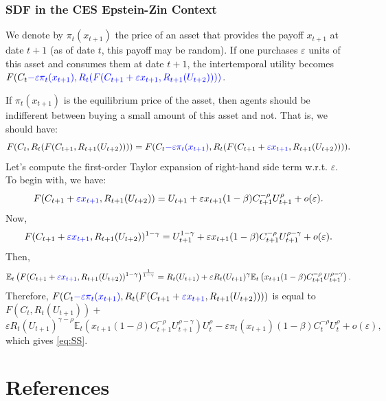 \documentclass[
  12pt,
]{book}
\theoremstyle{definition}
\theoremstyle{definition}
\theoremstyle{definition}
\theoremstyle{definition}
\theoremstyle{remark}
\begin{document}
\hypertarget{SDFEZ}{%
\subsection{SDF in the CES Epstein-Zin Context}\label{SDFEZ}}

We denote by \(\pi_t(x_{t+1})\) the price of an asset that provides the payoff \(x_{t+1}\) at date \(t+1\) (as of date \(t\), this payoff may be random). If one purchases \(\varepsilon\) units of this asset and consumes them at date \(t+1\), the intertemporal utility becomes \(F(C_t\color{blue}{ - \varepsilon \pi_t(x_{t+1})},R_t(F(C_{t+1}+\color{blue}{\varepsilon x_{t+1}},R_{t+1}(U_{t+2}))))\).

If \(\pi_t(x_{t+1})\) is the equilibrium price of the asset, then agents should be indifferent between buying a small amount of this asset and not. That is, we should have:
\[
F(C_t,R_t(F(C_{t+1},R_{t+1}(U_{t+2})))) =
F(C_t {\color{blue} - \varepsilon \pi_t(x_{t+1})},R_t(F(C_{t+1}+{\color{blue}\varepsilon x_{t+1}},R_{t+1}(U_{t+2})))).
\]
Let's compute the first-order Taylor expansion of right-hand side term w.r.t. \(\varepsilon\). To begin with, we have:
\[
F(C_{t+1}+{\color{blue}\varepsilon x_{t+1}},R_{t+1}(U_{t+2})) = U_{t+1} + \varepsilon x_{t+1} (1-\beta) C_{t+1}^{-\rho}U_{t+1}^\rho + o(\varepsilon).
\]
Now,
\[
F(C_{t+1}+{\color{blue}\varepsilon x_{t+1}},R_{t+1}(U_{t+2}))^{1-\gamma} = U_{t+1}^{1-\gamma} + \varepsilon x_{t+1}  (1-\beta) C_{t+1}^{-\rho}U_{t+1}^{\rho-\gamma} + o(\varepsilon).
\]
Then,
\[
\mathbb{E}_t \left( F(C_{t+1}+{\color{blue}\varepsilon x_{t+1}},R_{t+1}(U_{t+2}))^{1-\gamma} \right)^{\frac{1}{1-\gamma}}=R_t(U_{t+1}) + \varepsilon R_t(U_{t+1})^{\gamma} \mathbb{E}_t \left(  x_{t+1} (1-\beta) C_{t+1}^{-\rho} U_{t+1}^{\rho-\gamma} \right).
\]
Therefore, \(F(C_t{\color{blue} - \varepsilon \pi_t(x_{t+1})},R_t(F(C_{t+1}+{\color{blue}\varepsilon x_{t+1}},R_{t+1}(U_{t+2}))))\) is equal to \(F(C_t,R_t(U_{t+1}))+\)
\[
\varepsilon R_t(U_{t+1})^{\gamma - \rho} \mathbb{E}_t \left(  x_{t+1} (1-\beta) C_{t+1}^{-\rho} U_{t+1}^{\rho-\gamma} \right) U_t^{\rho}
- \varepsilon \pi_t(x_{t+1}) (1-\beta) C_t^{-\rho} U_t^{\rho} + o(\varepsilon),
\]
which gives \eqref{eq:SS}.

\hypertarget{references}{%
\chapter{References}\label{references}}

  
\end{document}
